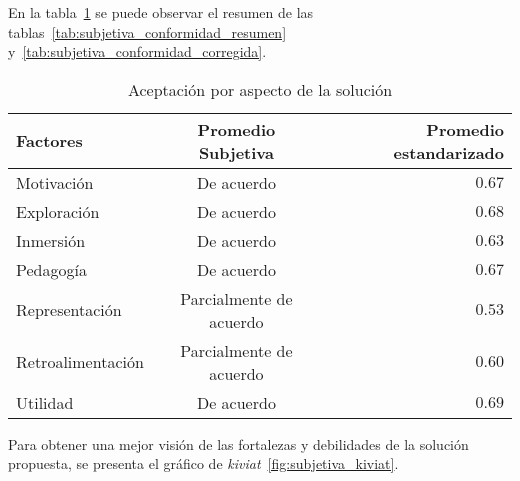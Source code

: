 
En la tabla~\ref{tab:resultado_resumen_aspectos_aceptacion} se puede observar el 
resumen de las tablas~\ref{tab:subjetiva_conformidad_resumen} y~\ref{tab:subjetiva_conformidad_corregida}.

%

\begin{table}[H]
\centering
\begin{tabular}{lcr}
\toprule
Factores        & Promedio Subjetiva      & Promedio estandarizado \\
\midrule
Motivación        & De acuerdo              & $0.67$  \\
Exploración       & De acuerdo              & $0.68$  \\
Inmersión         & De acuerdo              & $0.63$  \\
Pedagogía         & De acuerdo              & $0.67$  \\
Representación    & Parcialmente de acuerdo & $0.53$  \\
Retroalimentación & Parcialmente de acuerdo & $0.60$  \\
Utilidad          & De acuerdo              & $0.69$  \\
\bottomrule
\end{tabular}
\caption{Aceptación por aspecto de la solución}
\label{tab:resultado_resumen_aspectos_aceptacion}
\end{table}

Para  obtener una mejor visión de las fortalezas y debilidades de la solución
propuesta, se presenta el gráfico de \emph{kiviat}~\ref{fig:subjetiva_kiviat}.

